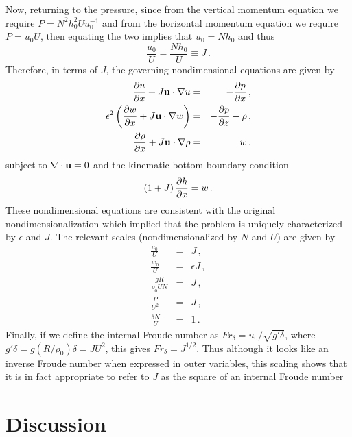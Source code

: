 \documentclass[12pt]{article}
\begin{document}
	Now, returning to the pressure, since from the vertical momentum equation we
	require $P = N^2h_0^2U u_0^{-1}$ and from the horizontal momentum equation we require $P = u_0 U$, then equating the
	two implies that $u_0 = N h_0$ and thus
	\[
	\frac{u_0}{U} = \frac{N h_0}{U} \equiv J\,.
	\]
	Therefore, in terms of $J$, the governing nondimensional equations are given by
	\begin{eqnarray*}
		\frac{\partial{u}}{\partial{x}} + J\mathbf{u}\cdot\nabla u &=& -\frac{\partial{p}}{\partial{x}}\,,\\
		\epsilon^2 \left(\frac{\partial{w}}{\partial{x}} + J\mathbf{u}\cdot\nabla w\right) &=& -\frac{\partial{p}}{\partial{z}} - \rho\,,\\
		\frac{\partial{\rho}}{\partial{x}} + J \mathbf{u}\cdot\nabla\rho &=& w\,,
	\end{eqnarray*}
	subject to $\nabla\cdot\mathbf{u}=0$ and the kinematic bottom boundary condition
	\[
	\left(1 + J \right)\frac{\partial{h}}{\partial{x}} = w\,.
	\]
	These nondimensional equations are consistent with the original nondimensionalization which implied
	that the problem is uniquely characterized by $\epsilon$ and $J$.
	The relevant scales (nondimensionalized by $N$ and $U$) are given by
	\begin{eqnarray*}
		\frac{u_0}{U} &=& J\,,\\
		\frac{w_0}{U} &=& \epsilon J\,,\\
		\frac{gR}{\rho_0 U N} &=& J\,,\\
		\frac{P}{U^2} &=& J\,,\\
		\frac{\delta N}{U} &=& 1\,.
	\end{eqnarray*}
	Finally,  if we define the internal Froude number as
	$Fr_\delta = u_0/\sqrt{g' \delta}$, where $g'\delta =g (R/\rho_0) \delta = J U^2$, this gives
	$Fr_{\delta} = J^{1/2}$. Thus although it looks like an inverse Froude number when expressed in outer variables, this scaling shows that it is
	in fact appropriate to refer to $J$ as the square of an internal Froude number 
	


	\section{Discussion}
	
\end{document}
